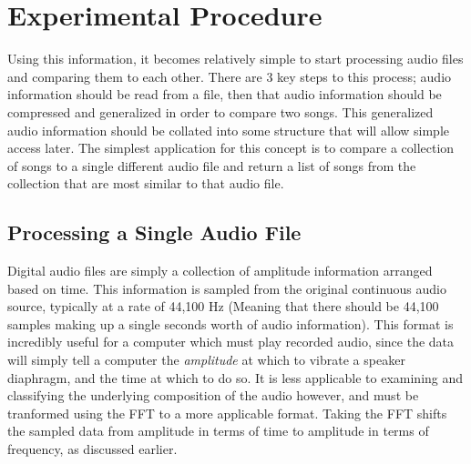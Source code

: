 \documentclass[conference]{IEEEtran}
\begin{document}
\section{Experimental Procedure}
Using this information, it becomes relatively simple to start processing audio files and comparing them to each other. There are 3 key steps to this process; audio information should be read from a file, then that audio information should be compressed and generalized in order to compare two songs. This generalized audio information should be collated into some structure that will allow simple access later. The simplest application for this concept is to compare a collection of songs to a single different audio file and return a list of songs from the collection that are most similar to that audio file.
\subsection{Processing a Single Audio File}
Digital audio files are simply a collection of amplitude information arranged based on time. This information is sampled from the original continuous audio source, typically at a rate of 44,100 Hz (Meaning that there should be 44,100 samples making up a single seconds worth of audio information). This format is incredibly useful for a computer which must play recorded audio, since the data will simply tell a computer the \textit{amplitude} at which to vibrate a speaker diaphragm, and the time at which to do so. It is less applicable to examining and classifying the underlying composition of the audio however, and must be tranformed using the FFT to a more applicable format. Taking the FFT shifts the sampled data from amplitude in terms of time to amplitude in terms of frequency, as discussed earlier.
\end{document}
